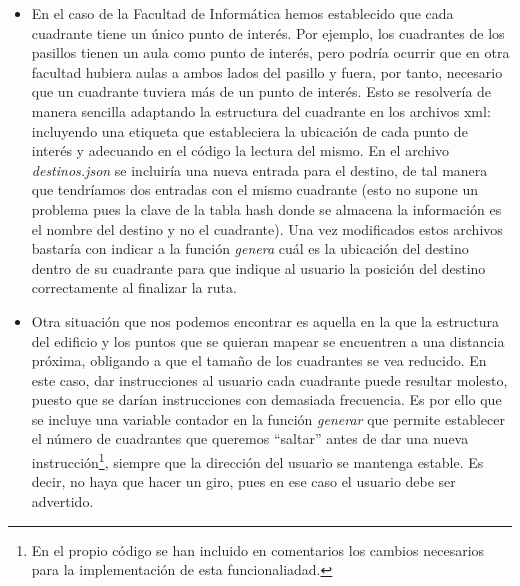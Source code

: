 \begin{itemize}

	\item En el caso de la Facultad de Informática hemos establecido que cada cuadrante tiene un único punto de interés. Por ejemplo, los cuadrantes de los pasillos tienen un aula como punto de interés, pero podría ocurrir que en otra facultad hubiera aulas a ambos lados del pasillo y fuera, por tanto, necesario que un cuadrante tuviera más de un punto de interés. Esto se resolvería de manera sencilla adaptando la estructura del cuadrante en los archivos xml: incluyendo una etiqueta que estableciera la ubicación de cada punto de interés y adecuando en el código la lectura del mismo. En el archivo \textit{destinos.json} se incluiría una nueva entrada para el destino, de tal manera que tendríamos dos entradas con el mismo cuadrante (esto no supone un problema pues la clave de la tabla hash donde se almacena la información es el nombre del destino y no el cuadrante). Una vez modificados estos archivos bastaría con indicar a la función \textit{genera} cuál es la ubicación del destino dentro de su cuadrante para que indique al usuario la posición del destino correctamente al finalizar la ruta.
	
	\item Otra situación que nos podemos encontrar es aquella en la que la estructura del edificio y los puntos que se quieran mapear se encuentren a una distancia próxima, obligando a que el tamaño de los cuadrantes se vea reducido. En este caso, dar instrucciones al usuario cada cuadrante puede resultar molesto, puesto que se darían instrucciones con demasiada frecuencia. Es por ello que se incluye una variable contador en la función \textit{generar} que permite establecer el número de cuadrantes que queremos ``saltar'' antes de dar una nueva instrucción\footnote{En el propio código se han incluido en comentarios los cambios necesarios para la implementación de esta funcionaliadad.}, siempre que la dirección del usuario se mantenga estable. Es decir, no haya que hacer un giro, pues en ese caso el usuario debe ser advertido. 

\end{itemize}